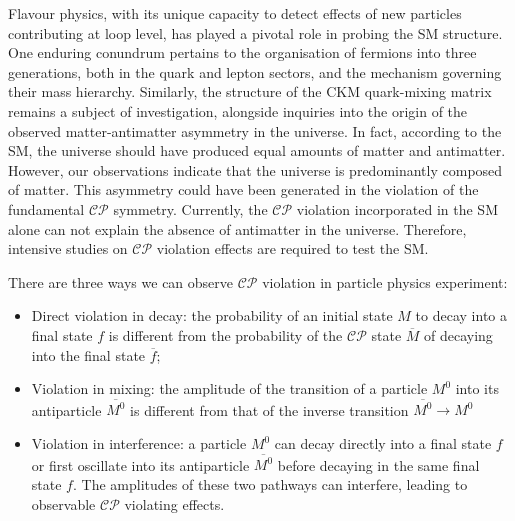 Flavour physics, with its unique capacity to detect effects of new particles contributing at loop level, has played a pivotal role in probing the SM structure. One enduring conundrum pertains to the organisation of fermions into three generations, both in the quark and lepton sectors, and the mechanism governing their mass hierarchy. Similarly, the structure of the CKM quark-mixing matrix remains a subject of investigation, alongside inquiries into the origin of the observed matter-antimatter asymmetry in the universe. In fact, according to the SM, the universe should have produced equal amounts of matter and antimatter. However, our observations indicate that the universe is predominantly composed of matter. This asymmetry could have been generated in the violation of the fundamental $\mathcal{CP}$ symmetry.  Currently, the $\mathcal{CP}$ violation incorporated in the SM alone can not explain the absence of antimatter in the universe. Therefore, intensive studies on $\mathcal{CP}$ violation effects are required to test the SM.

\begin{samepage}
There are three ways we can observe $\mathcal{CP}$ violation in particle physics experiment:
 \begin{itemize}
     \item Direct violation in decay: the probability of an initial state $M$ to decay into a final state $f$ is different from the probability of the $\mathcal{CP}$ state $\overline{M}$ of decaying into the final state $\overline{f}$;
     \item Violation in mixing: the amplitude of the transition of a particle $M^0$ into its antiparticle $\overline{M^0}$ is different from that of the inverse transition $\overline{M^0}\longrightarrow M^0$
     \item Violation in interference: a particle $M^0$ can decay directly into a final state $f$ or first oscillate into its antiparticle $\overline{M^0}$ before decaying in the same final state $f$. The amplitudes of these two pathways can interfere, leading to observable $\mathcal{CP}$ violating effects.
 \end{itemize}
 \end{samepage}
 
